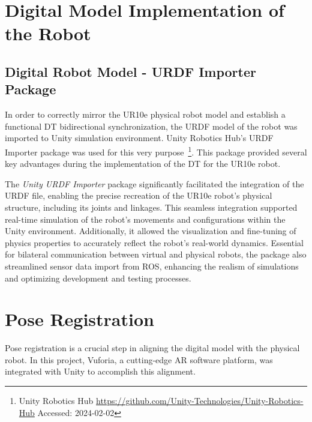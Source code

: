 


\section{Digital Model Implementation of the Robot}
\label{section:digital-model}

\subsection{Digital Robot Model - URDF Importer Package}
In order to correctly mirror the UR10e physical robot model and establish a functional \ac{DT} bidirectional synchronization, the \ac{URDF} model of the robot was imported to Unity simulation environment. Unity Robotics Hub's \ac{URDF} Importer package was used for this very purpose~\footnote{Unity Robotics Hub \url{https://github.com/Unity-Technologies/Unity-Robotics-Hub} Accessed: 2024-02-02}.
This package provided several key advantages during the implementation of the \ac{DT} for the UR10e robot.

The \textit{Unity \ac{URDF} Importer} package significantly facilitated the integration of the \ac{URDF} file, enabling the precise recreation of the UR10e robot's physical structure, including its joints and linkages. This seamless integration supported real-time simulation of the robot's movements and configurations within the \ac{Unity} environment. Additionally, it allowed the visualization and fine-tuning of physics properties to accurately reflect the robot's real-world dynamics. Essential for bilateral communication between virtual and physical robots, the package also streamlined sensor data import from \ac{ROS}, enhancing the realism of simulations and optimizing development and testing processes.

\section{Pose Registration}
Pose registration is a crucial step in aligning the digital model with the physical robot. In this project, Vuforia, a cutting-edge \ac{AR} software platform, was integrated with Unity to accomplish this alignment.

